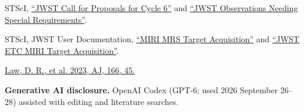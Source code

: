 \documentclass[12pt]{article}
\begin{document}
\noindent [48] STScI, \href{https://jwst-docs.stsci.edu/jwst-opportunities-and-policies/jwst-call-for-proposals-for-cycle-6}{``JWST Call for Proposals for Cycle 6''} and \href{https://jwst-docs.stsci.edu/jwst-opportunities-and-policies/jwst-call-for-proposals-for-cycle-6/jwst-proposal-types-and-categories/jwst-observations-needing-special-requirements}{``JWST Observations Needing Special Requirements''}.\par
\noindent [49] STScI, JWST User Documentation, \href{https://jwst-docs.stsci.edu/jwst-mid-infrared-instrument/miri-operations/miri-target-acquisition/miri-mrs-target-acquisition}{``MIRI MRS Target Acquisition''} and \href{https://jwst-docs.stsci.edu/jwst-exposure-time-calculator-overview/jwst-etc-calculations-page-overview/jwst-etc-target-acquisition/jwst-etc-miri-target-acquisition}{``JWST ETC MIRI Target Acquisition''}.\par
\noindent [50] \href{https://doi.org/10.3847/1538-3881/acdddc}{Law, D. R., et al. 2023, AJ, 166, 45.}\par

\noindent\textbf{Generative AI disclosure.} OpenAI Codex (GPT-6; used 2026 September 26--28) assisted with editing and literature searches.\par
\templateversion
\end{document}
